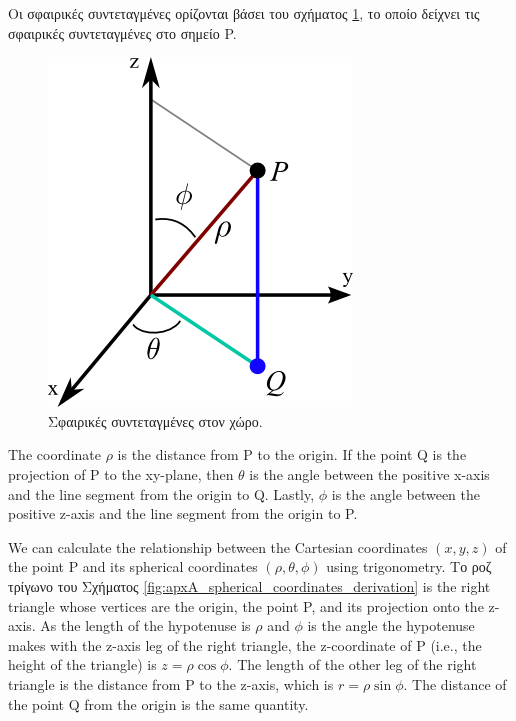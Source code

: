 Οι σφαιρικές συντεταγμένες ορίζονται βάσει του σχήματος \ref{fig:apxA_spherical_coordinates}, το οποίο δείχνει τις σφαιρικές συντεταγμένες στο σημείο P.

\begin{figure}[h]
    \centering
    \includegraphics[scale=0.5]{Figures/appendixA_spherical_coordinates_simple.png}
    \caption{Σφαιρικές συντεταγμένες στον χώρο.}
    \label{fig:apxA_spherical_coordinates}
\end{figure}

The coordinate $\rho$ is the distance from P to the origin. If the point Q is the projection of P to the xy-plane, then $\theta$ is the angle between the positive x-axis and the line segment from the origin to Q. Lastly, $\phi$ is the angle between the positive z-axis and the line segment from the origin to P.

We can calculate the relationship between the Cartesian coordinates $(x, y, z)$ of the point P and its spherical coordinates $(\rho, \theta, \phi)$ using trigonometry. Το ροζ τρίγωνο του Σχήματος \ref{fig:apxA_spherical_coordinates_derivation} is the right triangle whose vertices are the origin, the point P, and its projection onto the z-axis. As the length of the hypotenuse is $\rho$ and $\phi$ is the angle the hypotenuse makes with the z-axis leg of the right triangle, the z-coordinate of P (i.e., the height of the triangle) is $z = \rho \cos \phi$. The length of the other leg of the right triangle is the distance from P to the z-axis, which is $r = \rho \sin \phi$. The distance of the point Q from the origin is the same quantity.

